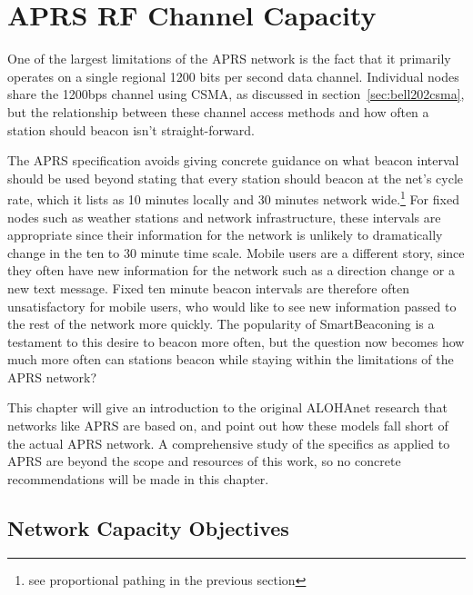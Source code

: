 \chapter{APRS RF Channel Capacity}
\label{chap:channelcapacity}

One of the largest limitations of the APRS network is the fact that
it primarily operates on a single regional 1200 bits per second data channel. 
Individual nodes share the 1200bps channel using 
CSMA, as discussed in section~\ref{sec:bell202csma}, but the relationship between 
these channel access methods and
how often a station should beacon isn't straight-forward.

The APRS specification avoids giving concrete guidance on what beacon interval should
be used beyond stating that every station should beacon at the net's cycle rate,
which it lists as 10 minutes locally and 30 minutes 
network wide\cite[p.~9]{aprsspec}.\footnote{see proportional
pathing in the previous section}
For fixed nodes such as weather stations and network infrastructure, 
these intervals are appropriate since their information for the network
is unlikely to dramatically change in the ten to 30 minute time scale.
Mobile users are a different story,
since they often have new information for the network
such as a direction change or a new text message.
Fixed ten minute beacon intervals are therefore often unsatisfactory for
mobile users, who would like to see new information passed to the rest of
the network more quickly.
The popularity of SmartBeaconing is a testament to this desire to beacon more often,
but the question now becomes how much more often can stations beacon while
staying within the limitations of the APRS network?

This chapter will give an introduction to the original ALOHAnet research
that networks like APRS are based on,
and point out how these models fall short of the actual APRS network.
A comprehensive study of the specifics as applied to APRS are beyond
the scope and resources of this work, so no concrete recommendations will be
made in this chapter.

\section{Network Capacity Objectives}

